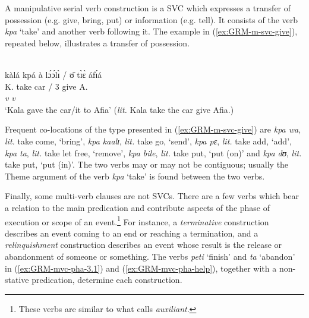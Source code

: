 \ea\label{ex:GRM-mvc-3-4}



\z 
 \z



A  manipulative serial verb construction \cite[378]{Amek06} is a SVC
which  expresses a transfer of possession (e.g. give, bring, put)  or  
information (e.g. tell). It consists of the verb {\it kpa} `take' and another
verb following it. The example in (\ref{ex:GRM-m-svc-give}), repeated below,
illustrates a transfer of possession. 

\begin{exe}

\\
\glll  kàlá kpá  {à lɔ́ɔ́lɪ̀ / ʊ̄} tɪ̀ɛ̀ áfɪ́á  \\
K. take  {{\art} car / 3\sg} give A.\\
{} {\it v} {}  {\it v} {} \\
\glt  `Kala gave the car/it to Afia' ({\it lit.} Kala take the car give Afia.)
 
\end{exe}


Frequent co-locations of the type presented in (\ref{ex:GRM-m-svc-give}) are 
{\it kpa wa}, {\it lit.}  take come,  `bring',  {\it kpa kaalɪ}, {\it lit.} 
take 
go,
`send', {\it kpa pɛ}, {\it lit.} take add,  `add', {\it kpa ta}, {\it lit.} take
let free, `remove', {\it kpa bile}, {\it lit.} take put,  `put (on)'  and {\it 
kpa
dʊ}, {\it lit.} take put,  `put (in)'. The two verbs may or may not be
contiguous;  usually the Theme argument of the  verb {\it kpa} `take'  is found
between the two verbs.






Finally, some multi-verb clauses are not  SVCs.  There are a few verbs
which
bear a
relation to the main predication and  contribute  aspects of the phase of
execution or scope of an event.\footnote{These verbs are similar 
to what \citet[108]{Bonv88}
calls {\it auxiliant}.} For instance, a {\it
terminative}  construction describes an event coming to an end or reaching a
termination, and  a {\it relinquishment} construction describes an event whose
result is the release or abandonment of someone or something.  The verbs {\it 
peti}
`finish' and {\it ta} `abandon' in (\ref{ex:GRM-mvc-pha-3.1}) and
(\ref{ex:GRM-mvc-pha-help}), together with a non-stative predication, determine
each construction. 



